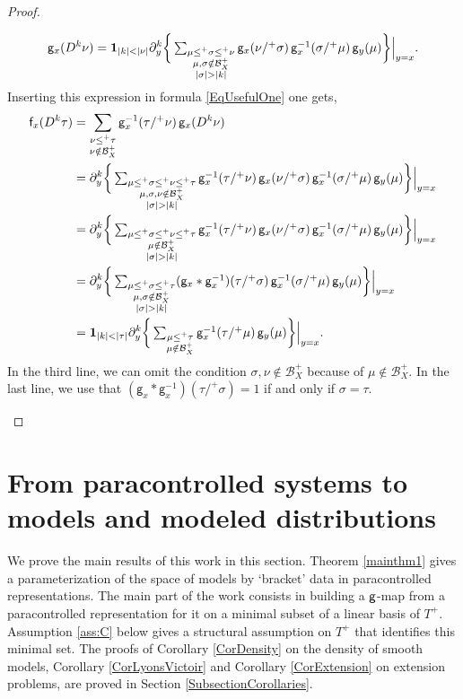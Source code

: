 \documentclass[JEP,XML,SOM,Unicode,published]{cedram}
\theoremstyle{plain}
\theoremstyle{definition}
\newcommand{\sff}{\mathsf{f}}
\newcommand{\sfg}{\mathsf{g}}
\newcommand{\mcB}{\mathcal{B}}
\begin{document}
\begin{proof}
\begin{itemize}
\[
\sfg_x(D^k\nu) = {\bf1}_{|k|<|\nu|}\partial_y^k \bigg\{\textstyle\sum_{\substack{\mu\le^+\sigma\le^+\nu \\ \mu,\sigma\notin\mcB_X^+\\|\sigma|>|k|}} \sfg_x(\nu/^+\sigma)\,\sfg_x^{-1}(\sigma/^+\mu)\,\sfg_y(\mu)\bigg\}\Big|_{y=x}.
\]
Inserting this expression in formula \eqref{EqUsefulOne} one gets,
\begin{align*}
\sff_x(D^k\tau)
&= \sum_{\substack{\nu\le^+\tau\\\nu\notin\mcB_X^+}} \sfg_x^{-1}(\tau/^+\nu)\,\sfg_x(D^k\nu) \\
&= \partial_y^k \bigg\{\textstyle\sum_{\substack{\mu\le^+\sigma\le^+\nu\le^+\tau \\ \mu,\sigma,\nu\notin\mcB_X^+\\|\sigma|>|k|}} \sfg_x^{-1}(\tau/^+\nu)\,\sfg_x(\nu/^+\sigma)\,\sfg_x^{-1}(\sigma/^+\mu)\,\sfg_y(\mu)\bigg\}\Big|_{y=x} \\
&= \partial_y^k \bigg\{\textstyle\sum_{\substack{\mu\le^+\sigma\le^+\nu\le^+\tau \\ \mu\notin\mcB_X^+\\|\sigma|>|k|}} \sfg_x^{-1}(\tau/^+\nu)\,\sfg_x(\nu/^+\sigma)\,\sfg_x^{-1}(\sigma/^+\mu)\,\sfg_y(\mu)\bigg\}\Big|_{y=x} \\
&= \partial_y^k \bigg\{\textstyle\sum_{\substack{\mu\le^+\sigma\le^+\tau \\ \mu,\sigma\notin\mcB_X^+\\|\sigma|>|k|}} (\sfg_x*\sfg_x^{-1})(\tau/^+\sigma)\,\sfg_x^{-1}(\sigma/^+\mu)\,\sfg_y(\mu)\bigg\}\Big|_{y=x} \\
&= {\bf1}_{|k|<|\tau|}\partial_y^k \bigg\{\textstyle\sum_{\substack{\mu\le^+\tau\\ \mu\notin\mcB_X^+}}\sfg_x^{-1}(\tau/^+\mu)\,\sfg_y(\mu)\bigg\}\Big|_{y=x}.
\end{align*}
In the third line, we can omit the condition $\sigma,\nu\notin\mcB_X^+$ because of $\mu\notin\mcB_X^+$.
In the last line, we use that $(\sfg_x*\sfg_x^{-1})(\tau/^+\sigma)=1$ if and only if $\sigma=\tau$.\qedhere
\end{itemize}
\end{proof}

\section{From paracontrolled systems to models and modeled distributions}
\label{SectionPCtoRS}

We prove the main results of this work in this section. Theorem \ref{mainthm1} gives a parameterization of the space of models by `bracket' data in paracontrolled representations. The main part of the work consists in building a $\sf g$-map from a paracontrolled representation for it on a minimal subset of a linear basis of $T^+$. Assumption \eqref{ass:C} below gives a structural assumption on $T^+$ that identifies this minimal set. The proofs of Corollary \ref{CorDensity} on the density of smooth models, Corollary \ref{CorLyonsVictoir} and Corollary \ref{CorExtension} on extension problems, are proved in Section \ref{SubsectionCorollaries}.
\end{document}
